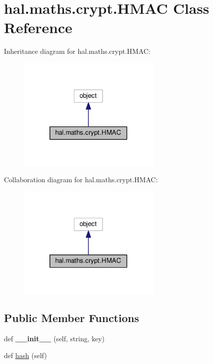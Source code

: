 \hypertarget{classhal_1_1maths_1_1crypt_1_1_h_m_a_c}{}\section{hal.\+maths.\+crypt.\+H\+M\+AC Class Reference}
\label{classhal_1_1maths_1_1crypt_1_1_h_m_a_c}


Inheritance diagram for hal.\+maths.\+crypt.\+H\+M\+AC\+:\nopagebreak
\begin{figure}[H]
\begin{center}
\leavevmode
\includegraphics[width=197pt]{classhal_1_1maths_1_1crypt_1_1_h_m_a_c__inherit__graph}
\end{center}
\end{figure}


Collaboration diagram for hal.\+maths.\+crypt.\+H\+M\+AC\+:\nopagebreak
\begin{figure}[H]
\begin{center}
\leavevmode
\includegraphics[width=197pt]{classhal_1_1maths_1_1crypt_1_1_h_m_a_c__coll__graph}
\end{center}
\end{figure}
\subsection*{Public Member Functions}
\begin{DoxyCompactItemize}
\item 
def {\bfseries \+\_\+\+\_\+init\+\_\+\+\_\+} (self, string, key)\hypertarget{classhal_1_1maths_1_1crypt_1_1_h_m_a_c_a0186db40c61b717b1ecc0d353272ee14}{}\label{classhal_1_1maths_1_1crypt_1_1_h_m_a_c_a0186db40c61b717b1ecc0d353272ee14}

\item 
def \hyperlink{classhal_1_1maths_1_1crypt_1_1_h_m_a_c_a6c5f1e283f7cb24eddffdda46734e71d}{hash} (self)
\end{DoxyCompactItemize}
